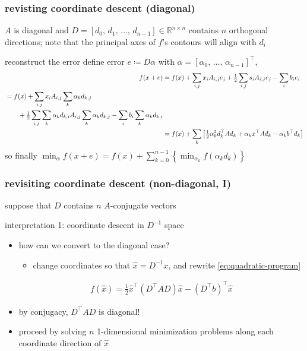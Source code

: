 \documentclass[10pt,dvipsnames*]{beamer}
\begin{document}
%
\begin{frame}
  \frametitle{revisting coordinate descent (diagonal)}
  \pause
  \begin{assumption*}
    $A$ is diagonal and $D = [d_0,\, d_1,\, \ldots,\, d_{n-1}] \in \mathbb{R}^{n \times n}$ contains $n$ orthogonal directions; note that the principal axes of $f$'s contours will align with $d_i$
  \end{assumption*}
  \pause
  \begin{alertblock}{reconstruct the error}
    define error $e \coloneqq D \alpha$ with $\alpha = [\alpha_0,\, \ldots,\, \alpha_{n-1}]^{\top}$,
    \begin{align}
      \hspace{-2\leftmargin}
      \label{eq:split-function-scalar}
      f(x + e) &= f(x) + \sum_{i,j} x_i A_{i,j} e_j + \tfrac 12 \sum_{i,j} s_i A_{i,j} e_j - \sum_i b_i e_i \\
      \begin{split}
        &= f(x) + \sum_{i,j} x_i A_{i,j} \sum_k \alpha_k d_{k,j} \\
        &\qquad + \tfrac 12 \sum_{i,j} \sum_k \alpha_k d_{k,i} A_{i,j}\sum_k \alpha_k d_{k,j} - \sum_i b_i \sum_k \alpha_k d_{k,i}
      \end{split}
      \\
      &= f(x) + \sum_k \left[ \tfrac 12 \alpha_k^2 d_k^{\top} A d_k + \alpha_k x^{\top} A d_k - \alpha_k b^{\top} d_k \right]
    \end{align}
    so finally $\min_{\alpha} f(x + e) = f(x) + \sum_{k=0}^{n-1} \left\{ \min_{\alpha_k} f(\alpha_k d_k) \right\}$
  \end{alertblock}
\end{frame}
%
\begin{frame}
  \frametitle{revisiting coordinate descent (non-diagonal, I)}
  \pause
  \begin{assumption*}
    suppose that $D$ contains $n$ $A$-conjugate vectors
  \end{assumption*}
  \pause
  \begin{alertblock}{interpretation 1: coordinate descent in $D^{-1}$ space}
    \begin{itemize}
      \item how can we convert to the diagonal case?
      \begin{itemize}
        \item change coordinates so that $\hat{x} = D^{-1}x$, and rewrite \cref{eq:quadratic-program}
      \end{itemize}
      \begin{align}
        \label{eq:quadratic-program-coordinate}
        f(\hat{x}) = \tfrac 12 \hat{x}^{\top} (D^{\top} A D) \hat{x} - (D^{\top}b)^{\top} \hat{x}
      \end{align}
      \item by conjugacy, $D^{\top} A D$ is diagonal!
      \item proceed by solving $n$ 1-dimensional minimization problems along each coordinate direction of $\hat{x}$ \cite{nocedal_numerical_2006}
    \end{itemize}
  \end{alertblock}
\end{frame}
\end{document}
